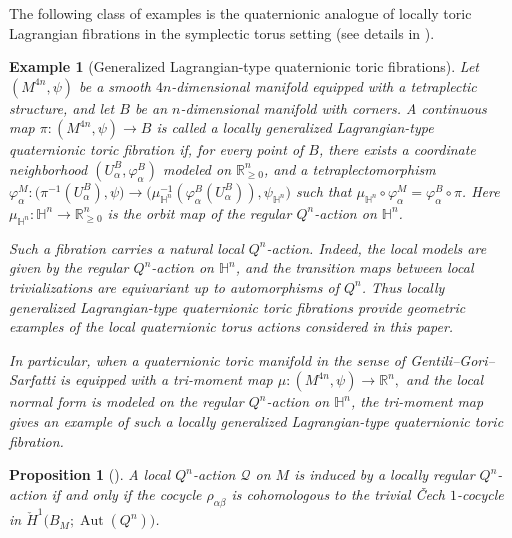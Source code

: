 \documentclass[11pt,a4paper]{article}
\numberwithin{equation}{section}
\newtheorem{example}[definition]{Example}
\newtheorem{prop}[definition]{Proposition}
\theoremstyle{named}
\begin{document}
The following class of examples is the quaternionic analogue of locally toric Lagrangian fibrations in the symplectic torus setting (see details in \cite[\S 5]{bg25}).

\begin{example}[Generalized Lagrangian-type quaternionic toric fibrations]
\label{ex:generalized-lagrangian-quaternionic-fibration}
Let \((M^{4n},\psi)\) be a smooth \(4n\)-dimensional manifold equipped with a tetraplectic structure, and let \(B\) be an \(n\)-dimensional manifold with corners. A continuous map \(\pi:(M^{4n},\psi)\longrightarrow B\) is called a \emph{locally generalized Lagrangian-type quaternionic toric fibration} if, for every point of \(B\), there exists a coordinate neighborhood \((U_\alpha^B,\varphi_\alpha^B)\) modeled on \(\mathbb R_{\geq 0}^n\), and a tetraplectomorphism \(\varphi_\alpha^M:\bigl(\pi^{-1}(U_\alpha^B),\psi\bigr)\longrightarrow\bigl(\mu_{\mathbb H^n}^{-1}(\varphi_\alpha^B(U_\alpha^B)),\psi_{\mathbb H^n}\bigr)\) such that \( \mu_{\mathbb H^n}\circ\varphi_\alpha^M = \varphi_\alpha^B\circ\pi\). Here \(\mu_{\mathbb H^n}:\mathbb H^n\longrightarrow\mathbb R_{\geq 0}^n\) is the orbit map of the regular \(Q^n\)-action on \(\mathbb H^n\).

Such a fibration carries a natural local \(Q^n\)-action. Indeed, the local models are given by the regular \(Q^n\)-action on \(\mathbb H^n\), and the transition maps between local trivializations are equivariant up to automorphisms of \(Q^n\). Thus locally generalized Lagrangian-type quaternionic toric fibrations provide geometric examples of the local quaternionic torus actions considered in this paper.

In particular, when a quaternionic toric manifold in the sense of Gentili--Gori--Sarfatti \cite{ggs} is equipped with a tri-moment map \(\mu:(M^{4n},\psi)\longrightarrow \mathbb R^n,\) and the local normal form is modeled on the regular \(Q^n\)-action on \(\mathbb H^n\), the tri-moment map gives an example of such a locally generalized Lagrangian-type quaternionic toric fibration.
\end{example}

\begin{prop}[{\cite[Proposition~2.12]{bg25}}]
\label{prop:globalization-obstruction}
A local \(Q^n\)-action \(\mathcal Q\) on \(M\) is induced by a locally regular \(Q^n\)-action if and only if the cocycle \({\rho_{\alpha\beta}}\) is cohomologous to the trivial Čech \(1\)-cocycle in \(\check H^1 \bigl(B_M;\operatorname{Aut}(Q^n)\bigr)\).
\end{prop}
\end{document}
